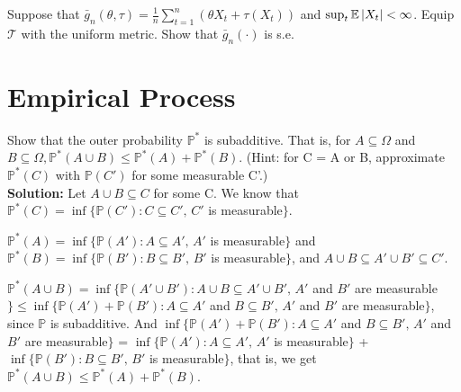 \documentclass[11pt,letterpaper]{article}                  %
\begin{document}
\bigskip
\begin{problem}

\end{problem}

\bigskip
\begin{problem}

\end{problem}

\bigskip
\begin{problem}

\end{problem}

\bigskip
\begin{problem}
Suppose that $\bar{g}_n (\theta, \tau) = \frac{1}{n} \sum_{t=1}^n (\theta X_t + \tau(X_t))$ and $\sup_t \mathbb{E}\left\lvert X_t\right\rvert < \infty$.
Equip $\mathcal{T}$ with the uniform metric.
Show that $\bar{g}_n (\cdot)$ is s.e.
\end{problem}

\section{Empirical Process}

\begin{problem} Show that the outer probability $\mathbb{P}^*$ is subadditive. That is, for $A \subseteq \Omega$ and $B \subseteq \Omega, \mathbb{P}^*(A \cup B) \leq \mathbb{P}^*(A) + \mathbb{P}^*(B)$. (Hint: for C = A or B, approximate $\mathbb{P}^*(C)$ with $\mathbb{P}(C')$ for some measurable C'.) \\
	
	\textbf{Solution:}  Let $A \cup B \subseteq C$ for some C. We know that $\mathbb{P}^*(C) = \inf \{\mathbb{P}(C'): C \subseteq C', \, C'$ is measurable$\}$. 
	
	$\mathbb{P}^*(A) = \inf \{\mathbb{P}(A'): A \subseteq A', \, A'$ is measurable$\}$ and $\mathbb{P}^*(B) = \inf \{\mathbb{P}(B'): B \subseteq B', \, B'$ is measurable$\}$, and $A \cup B \subseteq A' \cup B' \subseteq C'$. 
	
	$\mathbb{P}^*(A \cup B) = \inf \{\mathbb{P}(A' \cup B'): A \cup B \subseteq A' \cup B', \, A'$ and $B'$ are measurable$\} \leq \inf \{\mathbb{P}(A') +  \mathbb{P}(B'): A \subseteq A'$ and $B \subseteq B', \, A'$ and $B'$ are measurable$\}$, since $\mathbb{P}$ is subadditive. And $\inf \{\mathbb{P}(A') +  \mathbb{P}(B'): A \subseteq A'$ and $B \subseteq B', \, A'$ and $B'$ are measurable$\}$ = $\inf \{\mathbb{P}(A'): A \subseteq A', \, A'$ is measurable$\}$ + $\inf \{\mathbb{P}(B'): B \subseteq B', \, B'$ is measurable$\}$, that is, we get $\mathbb{P}^*(A \cup B) \leq \mathbb{P}^*(A) + \mathbb{P}^*(B)$.
\end{problem}
\end{document}
